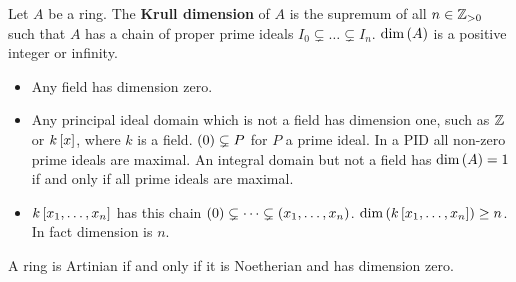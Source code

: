 \begin{definition}
Let $ A $ be a ring. The \textbf{Krull dimension} of $ A $ is the supremum of all $ n \in \Z_{> 0} $ such that $ A $ has a chain of proper prime ideals $ I_0 \subsetneq \dots \subsetneq I_n $. $ \dim\rb{A} $ is a positive integer or infinity.
\end{definition}

\begin{example*}
\hfill
\begin{itemize}
\item Any field has dimension zero.
\item Any principal ideal domain which is not a field has dimension one, such as $ \Z $ or $ k\sb{x} $, where $ k $ is a field. $ \rb{0} \subsetneq P $ for $ P $ a prime ideal. In a PID all non-zero prime ideals are maximal. An integral domain but not a field has $ \dim\rb{A} = 1 $ if and only if all prime ideals are maximal.
\item $ k\sb{x_1, \dots, x_n} $ has this chain $ \rb{0} \subsetneq \dots \subsetneq \rb{x_1, \dots, x_n} $. $ \dim\rb{k\sb{x_1, \dots, x_n}} \ge n $. In fact dimension is $ n $.
\end{itemize}
\end{example*}

\begin{theorem}
A ring is Artinian if and only if it is Noetherian and has dimension zero.
\end{theorem}

